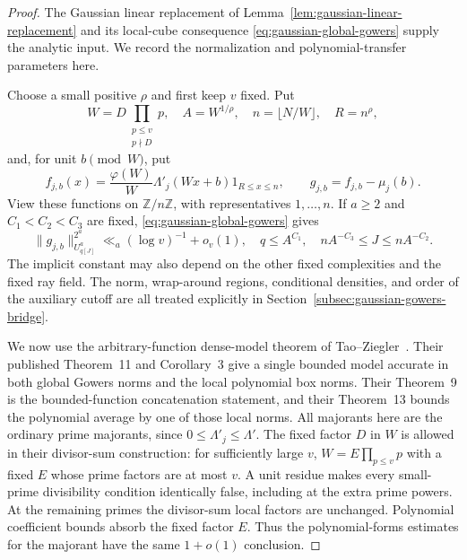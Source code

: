 \begin{proof}
The Gaussian linear replacement of
Lemma~\ref{lem:gaussian-linear-replacement} and its local-cube consequence
\eqref{eq:gaussian-global-gowers} supply the analytic input. We record
the normalization and polynomial-transfer parameters here.

Choose a small positive $\rho$ and first keep $v$ fixed. Put
\[
 W=D\prod_{\substack{p\leq v\\p\nmid D}}p,\quad
 A=W^{1/\rho},\quad n=\lfloor N/W\rfloor,\quad R=n^\rho,
\]
and, for unit $b\pmod W$, put
\[
 f_{j,b}(x)=\frac{\varphi(W)}W\Lambda'_j(Wx+b)1_{R\leq x\leq n},
 \qquad g_{j,b}=f_{j,b}-\mu_j(b).
\]
View these functions on $\mathbb Z/n\mathbb Z$, with representatives
$1,\ldots,n$. If $a\geq2$ and $C_1<C_2<C_3$ are fixed,
\eqref{eq:gaussian-global-gowers} gives
\begin{equation}\label{eq:v5-global-gowers}
 \|g_{j,b}\|_{U^a_{q[J]}}^{2^a}
       \ll_a(\log v)^{-1}+o_v(1),
 \quad q\leq A^{C_1},\quad
 nA^{-C_3}\leq J\leq nA^{-C_2}.
\end{equation}
The implicit constant may also depend on the other fixed complexities
and the fixed ray field. The norm, wrap-around regions, conditional
densities, and order of the auxiliary cutoff are all treated explicitly
in Section~\ref{subsec:gaussian-gowers-bridge}.

We now use the arbitrary-function dense-model theorem of
Tao--Ziegler~\cite{v5tz}. Their published Theorem~11 and Corollary~3
give a single bounded model accurate in both global Gowers norms and the
local polynomial box norms. Their Theorem~9 is the bounded-function
concatenation statement, and their Theorem~13 bounds the polynomial
average by one of those local norms. All majorants here are the ordinary
prime majorants, since $0\leq\Lambda'_j\leq\Lambda'$.
The fixed factor $D$ in $W$ is allowed in their divisor-sum construction:
for sufficiently large $v$, $W=E\prod_{p\leq v}p$ with a fixed $E$ whose
prime factors are at most $v$. A unit residue makes every small-prime
divisibility condition identically false, including at the extra prime
powers. At the remaining primes the divisor-sum local factors are
unchanged. Polynomial coefficient bounds absorb the fixed factor $E$.
Thus the polynomial-forms estimates for the majorant have the same
$1+o(1)$ conclusion.


\end{proof}
